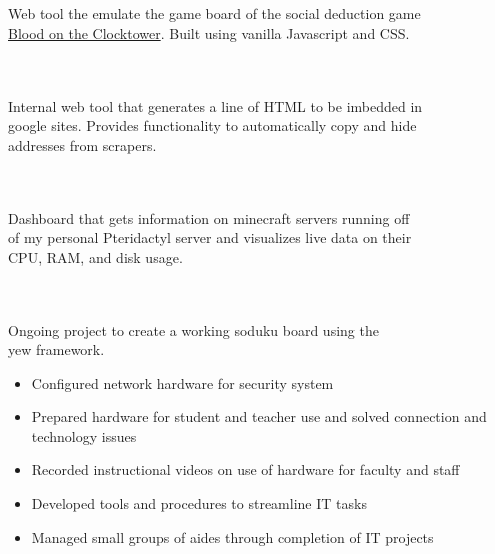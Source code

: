 \documentclass[10pt,a4paper,ragged2e,withhyper]{altacv}
\begin{document}
\begin{paracol}{2}



\\\smallskip
{} \\\smallskip
Web tool the emulate the game board of the social deduction game
\\\href{https://bloodontheclocktower.com/}{Blood on the Clocktower}. Built using vanilla Javascript and CSS.

\divider

\\\smallskip
{}\\\smallskip
Internal web tool that generates a line of HTML to be imbedded in\\
google sites. Provides functionality to automatically copy and hide\\
addresses from scrapers.

\divider

\\\smallskip
{} \\\smallskip
Dashboard that gets information on minecraft servers running off\\
of my personal Pteridactyl server and visualizes live data on their\\
CPU, RAM, and disk usage.

\divider

\\\smallskip
{} \\\smallskip
Ongoing project to create a working soduku board using the\\
yew framework.


\smallskip
{}

\begin{itemize}
\item Configured network hardware for security system
\item Prepared hardware for student and teacher use and solved connection and technology issues
\item Recorded instructional videos on use of hardware for faculty and staff
\item Developed tools and procedures to streamline IT tasks
\item Managed small groups of aides through completion of IT projects
\end{itemize}



\end{paracol}
\end{document}
